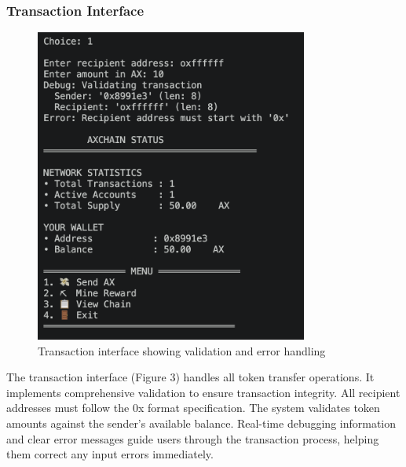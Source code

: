\documentclass[12pt]{article}
\begin{document}
\subsubsection{Transaction Interface}
\begin{figure}[H]
\centering
\includegraphics[width=0.8\textwidth]{transaction_menu.png}
\caption{Transaction interface showing validation and error handling}
\end{figure}

The transaction interface (Figure 3) handles all token transfer operations. It implements comprehensive validation to ensure transaction integrity. All recipient addresses must follow the 0x format specification. The system validates token amounts against the sender's available balance. Real-time debugging information and clear error messages guide users through the transaction process, helping them correct any input errors immediately.
\end{document}
